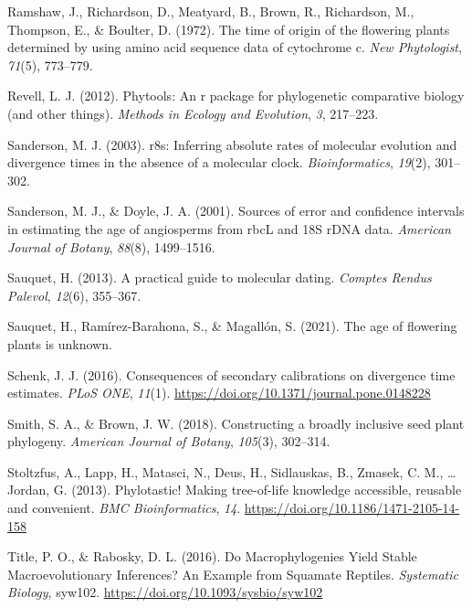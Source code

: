 \documentclass[
  english,
  man]{apa6}
\newlength{\cslhangindent}
\newlength{\cslentryspacingunit} %
\newenvironment{CSLReferences}[2] %
 {%
  \setlength{\parindent}{0pt}
  \ifodd #1
  \let\oldpar\par
  \def\par{\hangindent=\cslhangindent\oldpar}
  \fi
  \setlength{\parskip}{#2\cslentryspacingunit}
 }%
 {}
\begin{document}
\begin{CSLReferences}{1}{0}
\leavevmode{}%
Ramshaw, J., Richardson, D., Meatyard, B., Brown, R., Richardson, M., Thompson, E., \& Boulter, D. (1972). The time of origin of the flowering plants determined by using amino acid sequence data of cytochrome c. \emph{New Phytologist}, \emph{71}(5), 773--779.

\leavevmode{}%
Revell, L. J. (2012). Phytools: An r package for phylogenetic comparative biology (and other things). \emph{Methods in Ecology and Evolution}, \emph{3}, 217--223.

\leavevmode{}%
Sanderson, M. J. (2003). r8s: Inferring absolute rates of molecular evolution and divergence times in the absence of a molecular clock. \emph{Bioinformatics}, \emph{19}(2), 301--302.

\leavevmode{}%
Sanderson, M. J., \& Doyle, J. A. (2001). Sources of error and confidence intervals in estimating the age of angiosperms from rbcL and 18S rDNA data. \emph{American Journal of Botany}, \emph{88}(8), 1499--1516.

\leavevmode{}%
Sauquet, H. (2013). A practical guide to molecular dating. \emph{Comptes Rendus Palevol}, \emph{12}(6), 355--367.

\leavevmode{}%
Sauquet, H., Ramírez-Barahona, S., \& Magallón, S. (2021). The age of flowering plants is unknown.

\leavevmode{}%
Schenk, J. J. (2016). {Consequences of secondary calibrations on divergence time estimates}. \emph{PLoS ONE}, \emph{11}(1). \url{https://doi.org/10.1371/journal.pone.0148228}

\leavevmode{}%
Smith, S. A., \& Brown, J. W. (2018). Constructing a broadly inclusive seed plant phylogeny. \emph{American Journal of Botany}, \emph{105}(3), 302--314.

\leavevmode{}%
Stoltzfus, A., Lapp, H., Matasci, N., Deus, H., Sidlauskas, B., Zmasek, C. M., \ldots{} Jordan, G. (2013). {Phylotastic! Making tree-of-life knowledge accessible, reusable and convenient}. \emph{BMC Bioinformatics}, \emph{14}. \url{https://doi.org/10.1186/1471-2105-14-158}

\leavevmode{}%
Title, P. O., \& Rabosky, D. L. (2016). {Do Macrophylogenies Yield Stable Macroevolutionary Inferences? An Example from Squamate Reptiles}. \emph{Systematic Biology}, syw102. \url{https://doi.org/10.1093/sysbio/syw102}


\end{CSLReferences}
\end{document}
